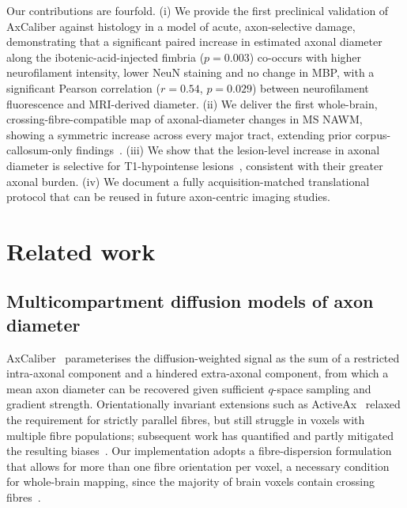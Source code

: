 \documentclass[11pt]{article}
\begin{document}
Our contributions are fourfold. (i) We provide the first preclinical validation of AxCaliber against histology in a model of acute, axon-selective damage, demonstrating that a significant paired increase in estimated axonal diameter along the ibotenic-acid-injected fimbria ($p=0.003$) co-occurs with higher neurofilament intensity, lower NeuN staining and no change in MBP, with a significant Pearson correlation ($r=0.54$, $p=0.029$) between neurofilament fluorescence and MRI-derived diameter. (ii) We deliver the first whole-brain, crossing-fibre-compatible map of axonal-diameter changes in MS NAWM, showing a symmetric increase across every major tract, extending prior corpus-callosum-only findings~\cite{desantis2019whole,ercan2015multimodal}. (iii) We show that the lesion-level increase in axonal diameter is selective for T1-hypointense lesions~\cite{vanwaesberghe1999axonal}, consistent with their greater axonal burden. (iv) We document a fully acquisition-matched translational protocol that can be reused in future axon-centric imaging studies.

\section{Related work}

\subsection*{Multicompartment diffusion models of axon diameter}
AxCaliber~\cite{assaf2008axcaliber} parameterises the diffusion-weighted signal as the sum of a restricted intra-axonal component and a hindered extra-axonal component, from which a mean axon diameter can be recovered given sufficient $q$-space sampling and gradient strength. Orientationally invariant extensions such as ActiveAx~\cite{alexander2010orientationally} relaxed the requirement for strictly parallel fibres, but still struggle in voxels with multiple fibre populations; subsequent work has quantified and partly mitigated the resulting biases~\cite{sepehrband2016towards,desantis2019whole}. Our implementation adopts a fibre-dispersion formulation~\cite{desantis2019whole,tax2014recursive} that allows for more than one fibre orientation per voxel, a necessary condition for whole-brain mapping, since the majority of brain voxels contain crossing fibres~\cite{jeurissen2013investigating}.
\end{document}
